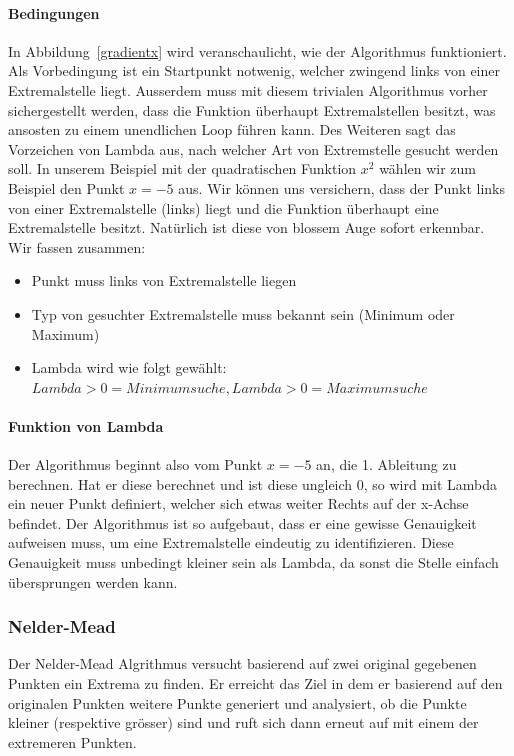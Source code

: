 \documentclass[10pt]{article}         %
\begin{document}
\paragraph{Bedingungen}
In Abbildung~\ref{gradientx} wird veranschaulicht, wie der Algorithmus funktioniert. Als Vorbedingung ist ein Startpunkt notwenig, welcher zwingend links von einer Extremalstelle liegt. Ausserdem muss mit diesem trivialen Algorithmus vorher sichergestellt werden, dass die Funktion überhaupt Extremalstellen besitzt, was ansosten zu einem unendlichen Loop führen kann. Des Weiteren sagt das Vorzeichen von Lambda aus, nach welcher Art von Extremstelle gesucht werden soll. In unserem Beispiel mit der quadratischen Funktion $x^2$ wählen wir zum Beispiel den Punkt $x=-5$ aus. Wir können uns versichern, dass der Punkt links von einer Extremalstelle (links) liegt und die Funktion überhaupt eine Extremalstelle besitzt. Natürlich ist diese von blossem Auge sofort erkennbar. 
Wir fassen zusammen:
\begin{itemize}
\item Punkt muss links von Extremalstelle liegen
\item Typ von gesuchter Extremalstelle muss bekannt sein (Minimum oder Maximum)
\item Lambda wird wie folgt gewählt: $Lambda > 0 = Minimumsuche, Lambda > 0 = Maximumsuche$
\end{itemize}

\paragraph{Funktion von Lambda}
Der Algorithmus beginnt also vom Punkt $x=-5$ an, die 1. Ableitung zu berechnen. Hat er diese berechnet und ist diese ungleich 0, so wird mit Lambda ein neuer Punkt definiert, welcher sich etwas weiter Rechts auf der x-Achse befindet. Der Algorithmus ist so aufgebaut, dass er eine gewisse Genauigkeit aufweisen muss, um eine Extremalstelle eindeutig zu identifizieren. Diese Genauigkeit muss unbedingt kleiner sein als Lambda, da sonst die Stelle einfach übersprungen werden kann.

\subsubsection{Nelder-Mead}
Der Nelder-Mead Algrithmus versucht basierend auf zwei original gegebenen Punkten ein Extrema zu finden. Er erreicht das Ziel in dem er basierend auf den originalen Punkten weitere Punkte generiert und analysiert, ob die Punkte kleiner (respektive grösser) sind und ruft sich dann erneut auf mit einem der extremeren Punkten.
\end{document}
